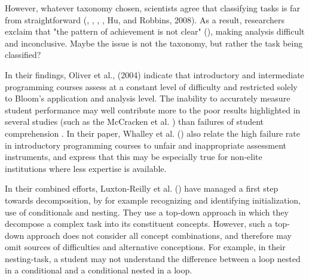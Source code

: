 However, whatever taxonomy chosen, scientists agree that classifying tasks is far from straightforward (\cite{Fuller2007}, \cite{thompson2008bloom}, \cite{LuxtonReilly2018}, \cite{Whalley2006}, Hu, and Robbins, 2008). As a result, researchers exclaim that "the pattern of achievement is not clear" (\cite{ZurBargury2013}), making analysis difficult and inconclusive. Maybe the issue is not the taxonomy, but rather the task being classified?


In their findings, Oliver et al., (2004) indicate that introductory and intermediate programming courses assess at a constant level of difficulty and restricted solely to Bloom’s application and analysis level. The inability to accurately measure student performance may well contribute more to the poor results highlighted in several studies (such as the McCracken et al. \cite{McCracken2001}) than failures of student comprehension \cite{2010TewGuzdial}.  In their paper, Whalley et al. (\cite{Whalley2006}) also relate the high failure rate in introductory programming courses to unfair and inappropriate assessment instruments, and express that this may be especially true for non-elite institutions where less expertise is available.


In their combined efforts, Luxton-Reilly et al. (\cite{LuxtonReilly2018}) have managed a first step towards decomposition, by for example recognizing and identifying initialization, use of conditionals and nesting. They use a top-down approach in which they decompose a complex task into its constituent concepts. However, such a top-down approach does not consider all concept combinations, and therefore may omit sources of difficulties and alternative conceptions. For example, in their nesting-task, a student may not understand the difference between a loop nested in a conditional and a conditional nested in a loop.



